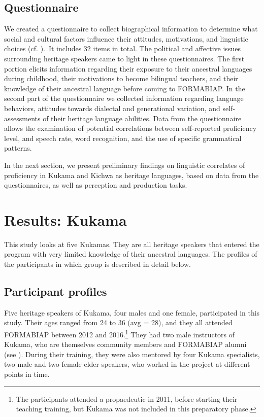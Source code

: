 \documentclass[output=paper]{langscibook}
\begin{document}
\subsection{{{Questionnaire}}}

We created a questionnaire to collect biographical information to determine what social and cultural factors influence their attitudes, motivations, and linguistic choices (cf. \citealt{Alarcon2010}).~It includes 32 items in total. The political and affective issues surrounding heritage speakers came to light in these questionnaires. The first portion elicits information regarding their exposure to their ancestral languages during childhood, their motivations to become bilingual teachers, and their knowledge of their ancestral language before coming to FORMABIAP. In the second part of the questionnaire we collected information regarding language behaviors, attitudes towards dialectal and generational variation, and self-assessments of their heritage language abilities. Data from the questionnaire allows the examination of potential correlations between self-reported proficiency level, and speech rate, word recognition, and the use of specific grammatical patterns.

In the next section, we present preliminary findings on linguistic correlates of proficiency in Kukama and Kichwa as heritage languages, based on data from the questionnaires, as well as perception and production tasks.

\section{{Results: Kukama}}\label{sec:7:5}

This study looks at five Kukamas. They are all heritage speakers that entered the program with very limited knowledge of their ancestral languages. The profiles of the participants in which group is described in detail below.

\subsection{{{Participant profiles}}}

\begin{sloppypar}
Five heritage speakers of Kukama, four males and one female, participated in this study. Their ages ranged from 24 to 36 (avg = 28), and they all attended FORMABIAP between 2012 and 2016.\footnote{{The participants attended a propaedeutic in 2011, before starting their teaching training, but Kukama was not included in this preparatory phase.}} They had two male instructors of Kukama, who are themselves community members and FORMABIAP alumni (see ). During their training, they were also mentored by four Kukama specialists, two male and two female elder speakers, who worked in the project at different points in time.
\end{sloppypar}
\end{document}
